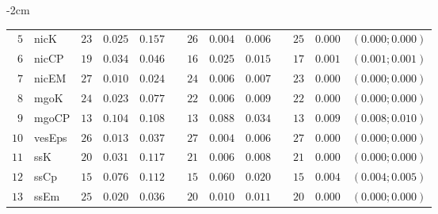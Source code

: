 \begin{table*}[!htbp]
\begin{adjustwidth*}{}{-2cm}
\begin{tabular}{@{}rlrrrrrrrrrcc@{}}
\footnotesize{$5 $} & \footnotesize{nicK     } & \footnotesize{$23$} & \footnotesize{$0.025$} & \footnotesize{$0.157$} && \footnotesize{$26$} & \footnotesize{$0.004$} & \footnotesize{$0.006$} && \footnotesize{$25$} & \footnotesize{$0.000$} & \footnotesize{$(0.000;0.000)$} \\
\footnotesize{$6 $} & \footnotesize{nicCP    } & \footnotesize{$19$} & \footnotesize{$0.034$} & \footnotesize{$0.046$} && \footnotesize{$16$} & \footnotesize{$0.025$} & \footnotesize{$0.015$} && \footnotesize{$17$} & \footnotesize{$0.001$} & \footnotesize{$(0.001;0.001)$} \\
\footnotesize{$7 $} & \footnotesize{nicEM    } & \footnotesize{$27$} & \footnotesize{$0.010$} & \footnotesize{$0.024$} && \footnotesize{$24$} & \footnotesize{$0.006$} & \footnotesize{$0.007$} && \footnotesize{$23$} & \footnotesize{$0.000$} & \footnotesize{$(0.000;0.000)$} \\
\footnotesize{$8 $} & \footnotesize{mgoK     } & \footnotesize{$24$} & \footnotesize{$0.023$} & \footnotesize{$0.077$} && \footnotesize{$22$} & \footnotesize{$0.006$} & \footnotesize{$0.009$} && \footnotesize{$22$} & \footnotesize{$0.000$} & \footnotesize{$(0.000;0.000)$} \\
\footnotesize{$9 $} & \footnotesize{mgoCP    } & \footnotesize{$13$} & \footnotesize{$0.104$} & \footnotesize{$0.108$} && \footnotesize{$13$} & \footnotesize{$0.088$} & \footnotesize{$0.034$} && \footnotesize{$13$} & \footnotesize{$0.009$} & \footnotesize{$(0.008;0.010)$} \\
\footnotesize{$10$} & \footnotesize{vesEps   } & \footnotesize{$26$} & \footnotesize{$0.013$} & \footnotesize{$0.037$} && \footnotesize{$27$} & \footnotesize{$0.004$} & \footnotesize{$0.006$} && \footnotesize{$27$} & \footnotesize{$0.000$} & \footnotesize{$(0.000;0.000)$} \\
\footnotesize{$11$} & \footnotesize{ssK      } & \footnotesize{$20$} & \footnotesize{$0.031$} & \footnotesize{$0.117$} && \footnotesize{$21$} & \footnotesize{$0.006$} & \footnotesize{$0.008$} && \footnotesize{$21$} & \footnotesize{$0.000$} & \footnotesize{$(0.000;0.000)$} \\
\footnotesize{$12$} & \footnotesize{ssCp     } & \footnotesize{$15$} & \footnotesize{$0.076$} & \footnotesize{$0.112$} && \footnotesize{$15$} & \footnotesize{$0.060$} & \footnotesize{$0.020$} && \footnotesize{$15$} & \footnotesize{$0.004$} & \footnotesize{$(0.004;0.005)$} \\
\footnotesize{$13$} & \footnotesize{ssEm     } & \footnotesize{$25$} & \footnotesize{$0.020$} & \footnotesize{$0.036$} && \footnotesize{$20$} & \footnotesize{$0.010$} & \footnotesize{$0.011$} && \footnotesize{$20$} & \footnotesize{$0.000$} & \footnotesize{$(0.000;0.000)$} \\

\end{tabular}
\end{adjustwidth*}
\end{table*}
